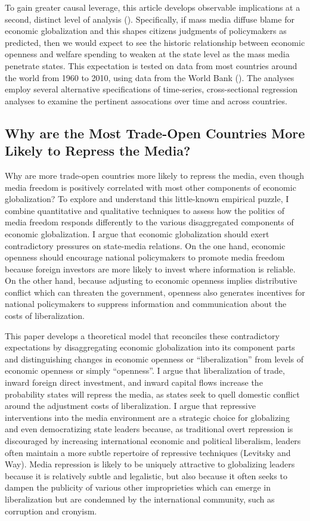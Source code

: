 \documentclass[12pt]{report}
\begin{document}
To gain greater causal leverage, this article develops observable implications at a second, distinct level of analysis (\citealt[30]{king1994designing}). Specifically, if mass media diffuse blame for economic globalization and this shapes citizens judgments of policymakers as predicted, then we would expect to see the historic relationship between economic openness and welfare spending to weaken at the state level as the mass media penetrate states. This expectation is tested on data from most countries around the world from 1960 to 2010, using data from the World Bank (\citealt{WorldDevelopmentIn:2012wl}). The analyses employ several alternative specifications of time-series, cross-sectional regression analyses to examine the pertinent assocations over time and across countries.

\subsection{Why are the Most Trade-Open Countries More Likely to Repress the Media?}

Why are more trade-open countries more likely to repress the media, even though media freedom is
positively correlated with most other components of economic globalization? To explore and
understand this little-known empirical puzzle, I combine quantitative and qualitative techniques to assess how the politics of media freedom responds differently to the various disaggregated components of economic globalization.
I argue that economic globalization should exert contradictory pressures on state-media relations. On the one hand, economic openness should encourage national policymakers to promote media freedom because foreign investors are more likely to invest where information is reliable. On the other hand, because adjusting to economic openness implies
distributive conflict which can threaten the government, openness also generates incentives for
national policymakers to suppress information and communication about the costs of liberalization.

This paper develops a theoretical model that reconciles these contradictory expectations by
disaggregating economic globalization into its component parts and distinguishing changes in economic openness
or ``liberalization'' from levels of economic openness or simply ``openness''. I argue that liberalization of
trade, inward foreign direct investment, and inward capital flows increase the probability states
will repress the media, as states seek to quell domestic conflict around the adjustment costs of
liberalization. I argue that repressive interventions into the media environment are a strategic choice for globalizing and even democratizing state leaders because, as traditional overt repression is discouraged by increasing international economic and political liberalism, leaders often maintain a more subtle repertoire of repressive techniques (Levitsky and Way). Media repression is likely to be uniquely attractive to globalizing leaders because it is relatively subtle and  legalistic, but also because it often seeks to dampen the publicity of various other improprieties which can emerge in liberalization but are condemned by the international community, such as corruption and cronyism.
\end{document}
